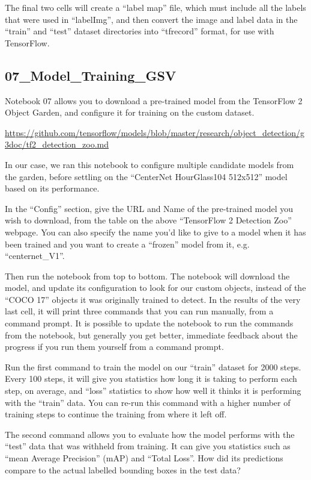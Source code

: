 \documentclass[11pt,twoside]{report}
\begin{document}
The final two cells will create a ``label map'' file, which must include all the labels that were used in ``labelImg'', and then convert the image and label data in the ``train'' and ``test'' dataset directories into ``tfrecord'' format, for use with TensorFlow.


\subsection{07\_Model\_Training\_GSV}

Notebook 07 allows you to download a pre-trained model from the TensorFlow 2 Object Garden, and configure it for training on the custom dataset.

\url{https://github.com/tensorflow/models/blob/master/research/object_detection/g3doc/tf2_detection_zoo.md}

In our case, we ran this notebook to configure multiple candidate models from the garden, before settling on the ``CenterNet HourGlass104 512x512'' model based on its performance.

In the ``Config'' section, give the URL and Name of the pre-trained model you wish to download, from the table on the above ``TensorFlow 2 Detection Zoo'' webpage.  You can also specify the name you'd like to give to a model when it has been trained and you want to create a ``frozen'' model from it, e.g. ``centernet\_V1''.

Then run the notebook from top to bottom.  The notebook will download the model, and update its configuration to look for our custom objects, instead of the ``COCO 17'' objects it was originally trained to detect.  In the results of the very last cell, it will print three commands that you can run manually, from a command prompt.  It is possible to update the notebook to run the commands from the notebook, but generally you get better, immediate feedback about the progress if you run them yourself from a command prompt.

Run the first command to train the model on our ``train'' dataset for 2000 steps.  Every 100 steps, it will give you statistics how long it is taking to perform each step, on average, and ``loss'' statistics to show how well it thinks it is performing with the ``train'' data.  You can re-run this command with a higher number of training steps to continue the training from where it left off.

The second command allows you to evaluate how the model performs with the ``test'' data that was withheld from training.  It can give you statistics such as ``mean Average Precision'' (mAP) and ``Total Loss''.  How did its predictions compare to the actual labelled bounding boxes in the test data?
\end{document}
